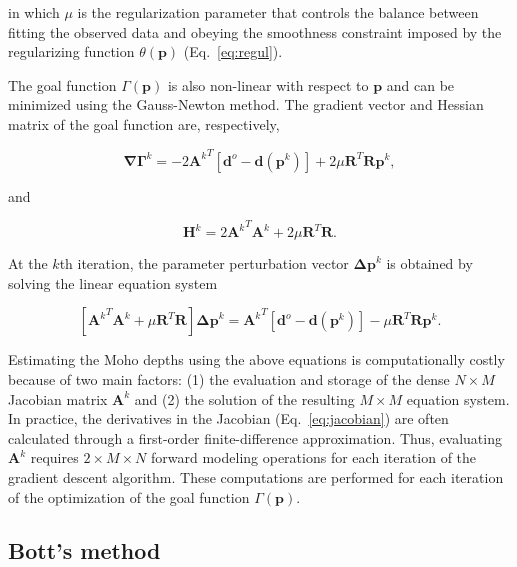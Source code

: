 \documentclass[extra,mreferee]{gji}
\begin{document}
\noindent
in which $\mu$ is the regularization parameter that controls the balance
between fitting the observed data and obeying the smoothness constraint imposed
by the regularizing function $\theta(\mathbf{p})$ (Eq.~\ref{eq:regul}).

The goal function $\Gamma(\mathbf{p})$ is also non-linear with respect to
$\mathbf{p}$ and can be minimized using the Gauss-Newton method.
The gradient vector and Hessian matrix of the goal function are, respectively,

\begin{equation}
    \mathbf{\nabla\Gamma}^k =
        -2{\mathbf{A}^k}^T[\mathbf{d}^o - \mathbf{d}(\mathbf{p}^k)] +
        2\mu\mathbf{R}^T\mathbf{R}\mathbf{p}^k,
    \label{eq:gradient-regul}
\end{equation}

\noindent and

\begin{equation}
    \mathbf{H}^k = 2{\mathbf{A}^k}^T{\mathbf{A}^k}
                   + 2\mu\mathbf{R}^T\mathbf{R}.
    \label{eq:hessian-regul}
\end{equation}

At the $k$th iteration, the parameter perturbation vector
$\mathbf{\Delta p}^k$ is obtained by solving the linear equation system

\begin{equation}
    \left[{\mathbf{A}^k}^T{\mathbf{A}^k} + \mu\mathbf{R}^T\mathbf{R}\right]
    \mathbf{\Delta p}^k =
    {\mathbf{A}^k}^T[\mathbf{d}^o - \mathbf{d}(\mathbf{p}^k)] -
    \mu\mathbf{R}^T\mathbf{R}\mathbf{p}^k.
    \label{eq:gaussnewton-regul}
\end{equation}

Estimating the Moho depths using the above equations is computationally
costly because of two main factors:
(1) the evaluation and storage of the dense $N \times M$ Jacobian matrix
${\mathbf{A}^k}$
and (2) the solution of the resulting $M \times M$ equation system.
In practice, the derivatives in the Jacobian (Eq.~\ref{eq:jacobian})
are often calculated through a first-order finite-difference approximation.
Thus, evaluating ${\mathbf{A}^k}$ requires $2\times M \times N$ forward modeling
operations for each iteration of the gradient descent algorithm.
These computations are performed for each iteration of the optimization
of the goal function $\Gamma(\mathbf{p})$.


\subsection{Bott's method}
\end{document}
